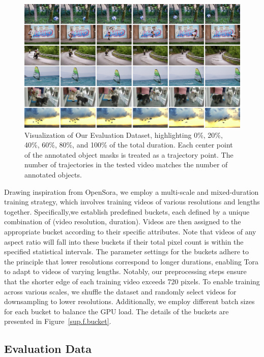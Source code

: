 \begin{figure}[!ht]
    \centering
    \includegraphics[width=\textwidth]{images/eval_data.pdf}
    \caption{
       Visualization of Our Evaluation Dataset, highlighting 0\%, 20\%, 40\%, 60\%, 80\%, and 100\% of the total duration. Each center point of the annotated object masks is treated as a trajectory point. The number of trajectories in the tested video matches the number of annotated objects.
    }
    \label{sup.f.eval}   
\end{figure}

Drawing inspiration from OpenSora, we employ a multi-scale and mixed-duration training strategy, which involves training videos of various resolutions and lengths together. Specifically,we establish predefined buckets, each defined by a unique combination of (video resolution, duration). Videos are then assigned to the appropriate bucket according to their specific attributes. Note that videos of any aspect ratio will fall into these buckets if their total pixel count is within the specified statistical intervals. The parameter settings for the buckets adhere to the principle that lower resolutions correspond to longer durations, enabling Tora to adapt to videos of varying lengths. Notably, our preprocessing steps ensure that the shorter edge of each training video exceeds 720 pixels. To enable training across various scales, we shuffle the dataset and randomly select videos for downsampling to lower resolutions. Additionally, we employ different batch sizes for each bucket to balance the GPU load. The details of the buckets are presented in Figure~\ref{sup.f.bucket}.




\subsection{Evaluation Data}

